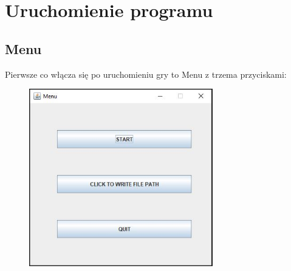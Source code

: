\documentclass{article}
\begin{document}

\section{Uruchomienie programu}

\subsection{Menu}
Pierwsze co włącza się po uruchomieniu gry to Menu z trzema przyciskami:
\begin{figure} [hbt!]
    \includegraphics[width=8cm,center]{images/menu.JPG}
\end{figure}
\end{document}
